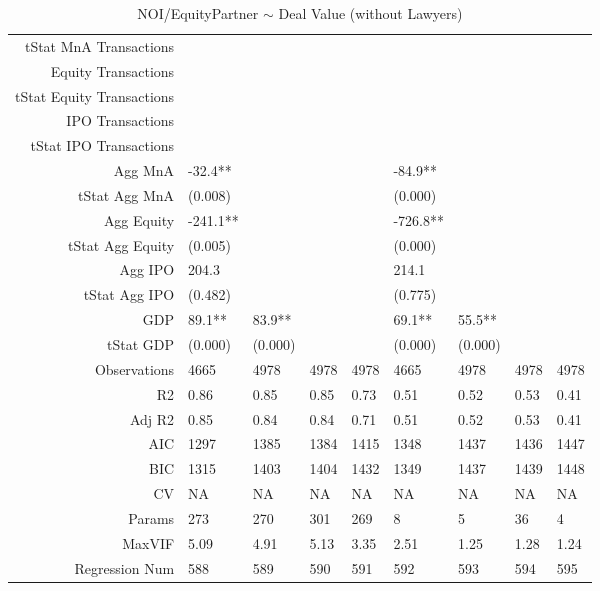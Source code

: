 \begin{table}[ht]
\begin{tabular}{rllllllll}
  tStat MnA Transactions &  &  &  &  &  &  &  &  \\ 
  Equity Transactions &  &  &  &  &  &  &  &  \\ 
  tStat Equity Transactions &  &  &  &  &  &  &  &  \\ 
  IPO Transactions &  &  &  &  &  &  &  &  \\ 
  tStat IPO Transactions &  &  &  &  &  &  &  &  \\ 
  Agg MnA & -32.4** &  &  &  & -84.9** &  &  &  \\ 
  tStat Agg MnA & (0.008) &  &  &  & (0.000) &  &  &  \\ 
  Agg Equity & -241.1** &  &  &  & -726.8** &  &  &  \\ 
  tStat Agg Equity & (0.005) &  &  &  & (0.000) &  &  &  \\ 
  Agg IPO & 204.3 &  &  &  & 214.1 &  &  &  \\ 
  tStat Agg IPO & (0.482) &  &  &  & (0.775) &  &  &  \\ 
  GDP & 89.1** & 83.9** &  &  & 69.1** & 55.5** &  &  \\ 
  tStat GDP & (0.000) & (0.000) &  &  & (0.000) & (0.000) &  &  \\ 
  Observations & 4665 & 4978 & 4978 & 4978 & 4665 & 4978 & 4978 & 4978 \\ 
  R2 & 0.86 & 0.85 & 0.85 & 0.73 & 0.51 & 0.52 & 0.53 & 0.41 \\ 
  Adj R2 & 0.85 & 0.84 & 0.84 & 0.71 & 0.51 & 0.52 & 0.53 & 0.41 \\ 
  AIC & 1297 & 1385 & 1384 & 1415 & 1348 & 1437 & 1436 & 1447 \\ 
  BIC & 1315 & 1403 & 1404 & 1432 & 1349 & 1437 & 1439 & 1448 \\ 
  CV & NA & NA & NA & NA & NA & NA & NA & NA \\ 
  Params & 273 & 270 & 301 & 269 & 8 & 5 & 36 & 4 \\ 
  MaxVIF & 5.09 & 4.91 & 5.13 & 3.35 & 2.51 & 1.25 & 1.28 & 1.24 \\ 
  Regression Num & 588 & 589 & 590 & 591 & 592 & 593 & 594 & 595 \\ 
   \hline
\end{tabular}
\caption{NOI/EquityPartner $\sim$ Deal Value (without Lawyers)} 
\end{table}
